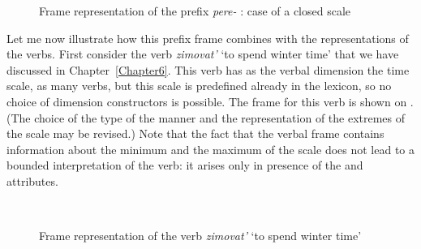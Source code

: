 \begin{figure}
\centering
{}
\caption{Frame representation of the prefix \textit{pere-}  : case of a closed scale \label{frame:pere:distr}}
\end{figure}

Let me now illustrate how this prefix frame combines with the representations of the verbs. First consider the verb \textit{zimovat'} `to spend winter time' that we have discussed in Chapter~\ref{Chapter6}. This verb has as the verbal dimension the time scale, as many verbs, but this scale is predefined already in the lexicon, so no choice of dimension constructors is possible. The frame for this verb is shown on . (The choice of the type of the manner and the representation of the extremes of the scale may be revised.) Note that the fact that the verbal frame contains information about the minimum and the maximum of the scale does not lead to a bounded interpretation of the verb: it arises only in presence of the \INIT and \FIN attributes.

\begin{figure}
\centering
{}\\
\hfill
\caption{Frame representation of the verb \textit{zimovat'} `to spend winter time' \label{frame:zimovat}}
\end{figure}

